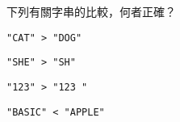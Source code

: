 \ifx\ntpcNinetyTwo\undefined[92學年基北區] \fi
下列有關字串的比較，何者正確？
  \begin{optionlist}
  \item \texttt{"CAT" > "DOG"}
  \item \texttt{"SHE" > "SH"}\label{ntpc-92-a17}
  \item \texttt{"123" > "123 "}
  \item \texttt{"BASIC" < "APPLE"}
  \end{optionlist}